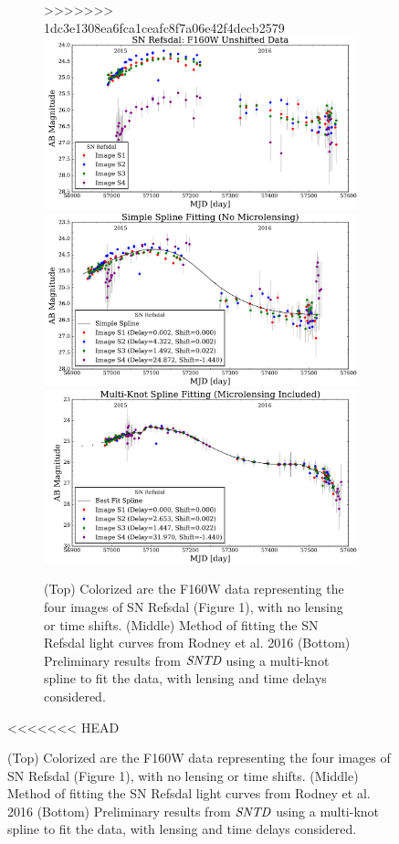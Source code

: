 \begin{figure}[h]
\begin{figure}[h]
>>>>>>> 1dc3e1308ea6fca1ceafc8f7a06e42f4decb2579
\centering
\includegraphics[width=.78\textwidth]{points_plot_2017.pdf}
\includegraphics[width=.78\textwidth]{refs_plot_2017.pdf}
\includegraphics[width=.78\textwidth]{spline_plot_2017.pdf}
\caption{(Top) Colorized are the F160W data representing the four images of SN
Refsdal (Figure 1), with no lensing or time shifts. (Middle) Method of
fitting the SN Refsdal light curves from Rodney et al. 2016 (Bottom)
Preliminary results from $\textit{SNTD}$ using a multi-knot spline to
fit the data, with lensing and time delays considered. }
\end{figure}
<<<<<<< HEAD

\pagebreak








\end{figure}
